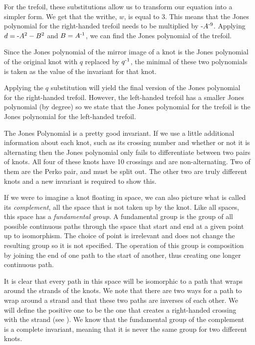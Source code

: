 \begin{paper}

For the trefoil, these substitutions allow us to transform our equation into a
simpler form.
We get that the writhe, $w$, is equal to 3.
This means that the Jones polynomial for the right-handed trefoil needs to be
multiplied by $\text-A^{\text-9}$.
Applying $d=\text-A^2-B^2$ and $B=A^{\text-1}$, we can find the Jones polynomial
of the trefoil.


Since the Jones polynomial of the mirror image of a knot is the Jones polynomial
of the original knot with $q$ replaced by $q^{\text-1}$, the minimal of these two
polynomials is taken as the value of the invariant for that knot.

Applying the $q$ substitution will yield the final version of the Jones
polynomial for the right-handed trefoil.
However, the left-handed trefoil has a smaller Jones polynomial (by degree) so
we state that the Jones polynomial for the trefoil is the Jones polynomial for
the left-handed trefoil.




The Jones Polynomial is a pretty good invariant.
If we use a little additional information about each knot, such as its crossing
number and whether or not it is alternating then the Jones polynomial only fails
to differentiate between two pairs of knots.
All four of these knots have 10 crossings and are non-alternating.
Two of them are the Perko pair, and must be split out.
The other two are truly different knots and a new invariant is required to show
this.

If we were to imagine a knot floating in space, we can also picture what is
called its \textit{complement}, all the space that is not taken up by the knot.
Like all spaces, this space has a \textit{fundamental group}.
A fundamental group is the group of all possible continuous paths through the
space that start and end at a given point up to isomorphism.
The choice of point is irrelevant and does not change the resulting group so it
is not specified.
The operation of this group is composition by joining the end of one path to the
start of another, thus creating one longer continuous path.

It is clear that every path in this space will be isomorphic to a path that
wraps around the strands of the knots.
We note that there are two ways for a path to wrap around a strand and that
these two paths are inverses of each other.
We will define the positive one to be the one that creates a right-handed
crossing with the strand (see \figCrossings).
We know that the fundamental group of the complement is a complete invariant,
meaning that it is never the same group for two different knots.


\end{paper}
